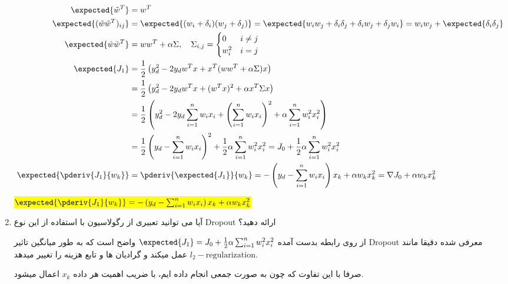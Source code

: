 \begin{enumerate}
{\begin{qsolve}[]
              \vspace*{-3em}
		      \begin{align*}
			      \expected{\tilde{w}^T}                 & = w^T                                                  \\
			      \expected{(\tilde{w}\tilde{w}^T)_{ij}} & =\expected{(w_i+\delta_i)(w_j+\delta_j)}=
			      \expected{w_iw_j+\delta_i\delta_j+\delta_iw_j+\delta_jw_i}=w_iw_j+\expected{\delta_i\delta_j} \\
			      \expected{\tilde{w}\tilde{w}^T}        & =ww^T+\alpha\Sigma,\quad \Sigma_{i,j}=
			      \begin{cases}
				      0     & i\neq j \\
				      w_i^2 & i=j
			      \end{cases}                                                                               \\
			      \expected{J_1}                         & =\frac{1}{2}\left(y_d^2-2y_dw^Tx+x^T(ww^T+\alpha\Sigma)x\right)
                  \\
                  &=\frac{1}{2}\left(y_d^2-2y_dw^Tx+(w^Tx)^2+\alpha x^T\Sigma x\right)\\
                  &= \frac{1}{2}\left(y_d^2-2y_d\sum_{i=1}^{n}w_ix_i+\left(\sum_{i=1}^{n}w_ix_i\right)^2+\alpha\sum_{i=1}^{n}w_i^2x_i^2\right)\\
                  &= \frac{1}{2}\left(y_d-\sum_{i=1}^{n}w_ix_i\right)^2+\frac{1}{2}\alpha\sum_{i=1}^{n}w_i^2x_i^2=J_0+\frac{1}{2}\alpha\sum_{i=1}^{n}w_i^2x_i^2\\
                  \expected{\pderiv{J_1}{w_k}} & = \pderiv{\expected{J_1}}{w_k} = 
                  -\left(y_d-\sum_{i=1}^{n}w_ix_i\right)x_k+\alpha w_k x_k^2=\nabla J_0 + \alpha w_kx_k^2
		      \end{align*}
		      \centerline{
			      \hl{$ \expected{\pderiv{J_1}{w_k}}=-\left(y_d-\sum_{i=1}^{n}w_ix_i\right)x_k+\alpha w_k x_k^2$}
		      }
	      \end{qsolve}
	      }
          \item {
            آیا می توانید تعبیری از رگولاسیون با استفاده از این نوع Dropout ارائه دهید؟

            \begin{qsolve}[]
                از روی رابطه بدست آمده 
                $\expected{J_1}=J_0+\frac{1}{2}\alpha\sum_{i=1}^{n}w_i^2x_i^2$ 
                واضح است که به طور میانگین تاثیر Dropout معرفی شده دقیقا مانند $l_2-\text{regularization}$ 
                عمل میکند و گرادیان ها و تابع هزینه را تغییر میدهد.

                صرفا با این تفاوت که چون به صورت جمعی انجام داده ایم، با ضریب اهمیت هر داده $x_k$ اعمال میشود.
            \end{qsolve}
          }
\end{enumerate}